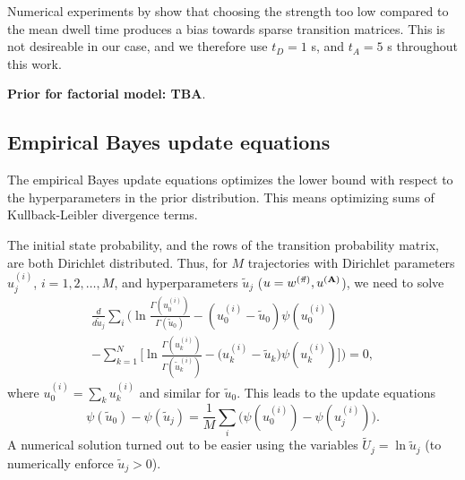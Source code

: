 Numerical experiments by \citet{persson2013} show that choosing the
strength too low compared to the mean dwell time produces a bias
towards sparse transition matrices. This is not desireable in our
case, and we therefore use $t_D=1$ s, and $t_A=5$ s throughout this
work.


{\bf Prior for factorial model: TBA}.\cite{factorialmodelprior}

\subsection{Empirical Bayes update equations}
The empirical Bayes update equations optimizes the lower bound with
respect to the hyperparameters in the prior distribution. This means
optimizing sums of Kullback-Leibler divergence terms. 

The initial state probability, and the rows of the transition
probability matrix, are both Dirichlet distributed. Thus, for $M$
trajectories with Dirichlet parameters $u_j^{(i)}$, $i=1,2,\ldots,M$,
and hyperparameters $\tilde{u}_j$ ($u = w^{(\vec\pi)},u^{(\mathbf{A})}$),
we need to solve
\begin{multline}
\frac{d}{d \tilde u_j} \sum_i\Bigg( 
 \ln\frac{\Gamma(u_0^{(i)})}{\Gamma(\tilde u_0)}
    -(u_0^{(i)}-\tilde u_0)\psi(u_0^{(i)})\\
    -\sum_{k=1}^N\bigg[
      \ln\frac{\Gamma(u_k^{(i)})}{\Gamma(\tilde u_k^{(i)})}
      -\big(u_k^{(i)}-\tilde u_k\big)
      \psi(u_k^{(i)})\bigg]\Bigg)=0,
\end{multline}
where $u_0^{(i)}=\sum_ku_k^{(i)}$ and similar for $\tilde u_0$. This
leads to the update equations
\begin{equation}
  \psi(\tilde u_0)-\psi(\tilde u_j)
=\frac{1}{M}\sum_i\bigg(
  \psi(u_0^{(i)})-\psi(u_j^{(i)})\bigg).
\end{equation}
A numerical solution turned out to be easier using the variables
$\tilde U_j=\ln \tilde u_j$ (to numerically enforce $\tilde u_j>0$).

